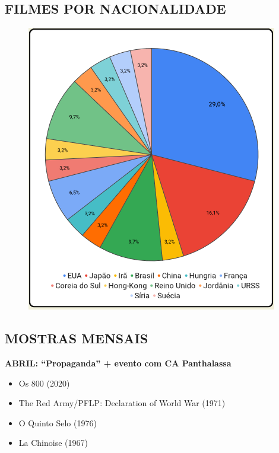 \begin{multicols}{2}

    {\centering 
    \subsection*{\color{black} FILMES POR NACIONALIDADE}
    \vspace{.8cm}
    \begin{figure}[H]
        \centering
        \includegraphics[width=0.9\linewidth]{textos//img/filmes_por_nacionalidade.png}
    \end{figure}
    }

    \subsection*{\color{black} MOSTRAS MENSAIS}
    \textbf{ABRIL: “Propaganda” + evento com CA Panthalassa} \vspace{-0.5cm}
    \begin{itemize}[itemsep=-0.5cm]
        \item Os 800 (2020)
        \item The Red Army/PFLP: Declaration of World War (1971)
        \item O Quinto Selo (1976)
        \item La Chinoise (1967)
    \end{itemize}
    

\end{multicols}
